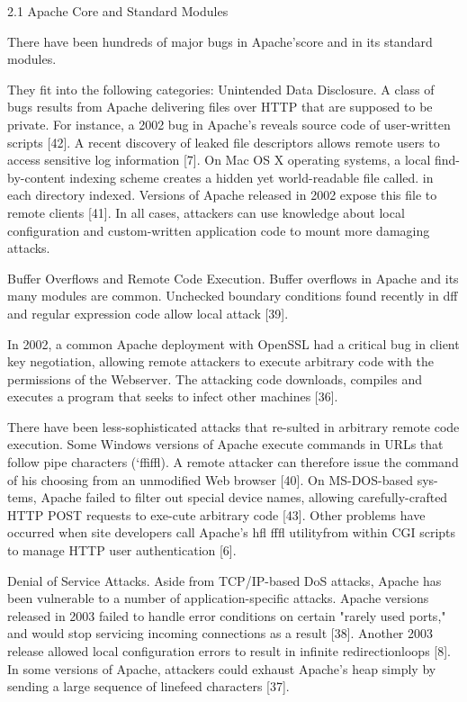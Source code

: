 2.1 Apache Core and Standard Modules

There have been hundreds of major bugs in Apache'score and in its standard
modules. 

They fit into the following categories:
Unintended Data Disclosure. A class of bugs results from Apache delivering files
over HTTP that are supposed to be private. 
For instance, a 2002 bug in Apache's reveals source code of user-written
scripts [42].
A recent discovery of leaked file descriptors allows remote users to access
sensitive log information [7]. 
On Mac OS X operating systems, a local find-by-content indexing scheme creates
a hidden yet world-readable file called.
in each directory indexed.
Versions of Apache released in 2002 expose this file to remote clients [41].
In all cases, attackers can use knowledge about local configuration and
custom-written application code to mount more damaging attacks.

Buffer Overflows and Remote Code Execution.
Buffer overflows in Apache and its many modules are common.
Unchecked boundary conditions found recently in dff and regular expression code
allow local attack [39].

In 2002, a common Apache deployment with OpenSSL had a critical bug in client
key negotiation, allowing remote attackers to execute arbitrary code with the
permissions of the Webserver.
The attacking code downloads, compiles and executes a program that seeks to
infect other machines [36].

There have been less-sophisticated attacks that re-sulted in arbitrary remote
code execution.
Some Windows versions of Apache execute commands in URLs that follow pipe
characters (`ffiffl).
A remote attacker can therefore issue the command of his choosing from an
unmodified Web browser [40].
On MS-DOS-based sys-tems, Apache failed to filter out special device names,
allowing carefully-crafted HTTP POST requests to exe-cute arbitrary code [43].
Other problems have occurred when site developers call Apache's hfl fffl
utilityfrom within CGI scripts to manage HTTP user authentication [6].

Denial of Service Attacks. Aside from TCP/IP-based DoS attacks, Apache has been
vulnerable to a number of application-specific attacks.
Apache versions released in 2003 failed to handle error conditions on certain
"rarely used ports," and would stop servicing incoming connections as a result
[38].
Another 2003 release allowed local configuration errors to result in infinite
redirectionloops [8].
In some versions of Apache, attackers could exhaust Apache's heap simply by
sending a large sequence of linefeed characters [37].


